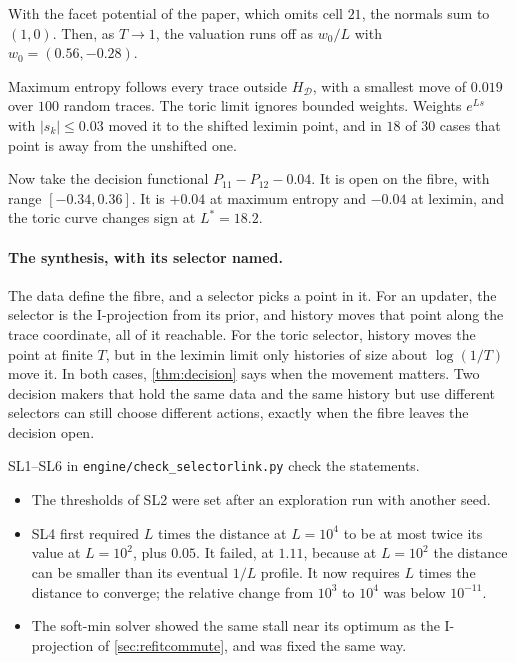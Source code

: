 \documentclass[11pt]{article}
\theoremstyle{definition}\newtheorem{definition}[theorem]{Definition}\newtheorem{remark}[theorem]{Remark}\newtheorem{example}[theorem]{Example}\newtheorem{problem}[theorem]{Open problem}\crefname{problem}{Problem}{Problems}
\begin{document}
With the facet potential of the paper, which omits cell $21$, the normals sum to $(1,0)$. Then, as $T\to1$, the valuation runs off as $w_0/L$ with $w_0=(0.56,-0.28)$.

Maximum entropy follows every trace outside $H_{\mathcal D}$, with a smallest move of $0.019$ over $100$ random traces. The toric limit ignores bounded weights. Weights $e^{Ls}$ with $|s_k|\le0.03$ moved it to the shifted leximin point, and in $18$ of $30$ cases that point is away from the unshifted one.

Now take the decision functional $P_{11}-P_{12}-0.04$. It is open on the fibre, with range $[-0.34,0.36]$. It is $+0.04$ at maximum entropy and $-0.04$ at leximin, and the toric curve changes sign at $L^*=18.2$.

\paragraph{The synthesis, with its selector named.} The data define the fibre, and a selector picks a point in it. For an updater, the selector is the I-projection from its prior, and history moves that point along the trace coordinate, all of it reachable. For the toric selector, history moves the point at finite $T$, but in the leximin limit only histories of size about $\log(1/T)$ move it. In both cases, \cref{thm:decision} says when the movement matters. Two decision makers that hold the same data and the same history but use different selectors can still choose different actions, exactly when the fibre leaves the decision open.

SL1--SL6 in \texttt{engine/check\_selectorlink.py} check the statements.
\begin{itemize}
\item The thresholds of SL2 were set after an exploration run with another seed.
\item SL4 first required $L$ times the distance at $L=10^4$ to be at most twice its value at $L=10^2$, plus $0.05$. It failed, at $1.11$, because at $L=10^2$ the distance can be smaller than its eventual $1/L$ profile. It now requires $L$ times the distance to converge; the relative change from $10^3$ to $10^4$ was below $10^{-11}$.
\item The soft-min solver showed the same stall near its optimum as the I-projection of \cref{sec:refitcommute}, and was fixed the same way.
\end{itemize}
\end{document}
